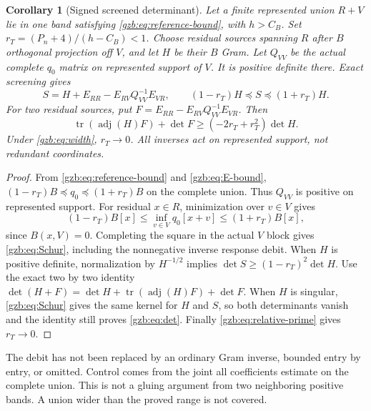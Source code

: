 \documentclass[11pt,a4paper]{article}
\numberwithin{equation}{section}
\newtheorem{corollary}[theorem]{Corollary}
\theoremstyle{definition}\newtheorem{definition}[theorem]{Definition}
\theoremstyle{remark}\newtheorem{remark}[theorem]{Remark}
\DeclareMathOperator{\adj}{adj}
\begin{document}
\begin{corollary}[Signed screened determinant]\label{gzb:cor:schur}
Let a finite represented union $R+V$ lie in one band satisfying
\eqref{gzb:eq:reference-bound}, with $h>C_B$. Set
$r_T=(P_n+4)/(h-C_B)<1$.
Choose residual sources spanning $R$ after $B$ orthogonal projection
off $V$, and let $H$ be their $B$ Gram.
Let $Q_{VV}$ be the actual complete $q_0$ matrix on represented support
of $V$. It is positive definite there. Exact screening gives
\begin{equation}\label{gzb:eq:Schur}
 S=H+E_{RR}-E_{RV}Q_{VV}^{-1}E_{VR},\qquad
 (1-r_T)H\preceq S\preceq(1+r_T)H.
\end{equation}
For two residual sources, put
$F=E_{RR}-E_{RV}Q_{VV}^{-1}E_{VR}$. Then
\begin{equation}\label{gzb:eq:det}
 \operatorname{tr}(\adj(H)F)+\det F
                   \ge(-2r_T+r_T^2)\det H.
\end{equation}
Under \eqref{gzb:eq:width}, $r_T\to0$.
All inverses act on represented support, not redundant coordinates.
\end{corollary}
\begin{proof}
From \eqref{gzb:eq:reference-bound} and \eqref{gzb:eq:E-bound},
$(1-r_T)B\preceq q_0\preceq(1+r_T)B$ on the complete union.
Thus $Q_{VV}$ is positive on represented support.
For residual $x\in R$, minimization over $v\in V$ gives
\[
 (1-r_T)B[x]\le\inf_{v\in V}q_0[x+v]\le(1+r_T)B[x],
\]
since $B(x,V)=0$.
Completing the square in the actual $V$ block gives \eqref{gzb:eq:Schur},
including the nonnegative inverse response debit.
When $H$ is positive definite, normalization by $H^{-1/2}$ implies
$\det S\ge(1-r_T)^2\det H$.
Use the exact two by two identity
$\det(H+F)=\det H+\operatorname{tr}(\adj(H)F)+\det F$.
When $H$ is singular, \eqref{gzb:eq:Schur} gives the same kernel for $H$
and $S$, so both determinants vanish and the identity still proves
\eqref{gzb:eq:det}. Finally \eqref{gzb:eq:relative-prime} gives $r_T\to0$.
\end{proof}

The debit has not been replaced by an ordinary Gram inverse, bounded
entry by entry, or omitted. Control comes from the joint all coefficients
estimate on the complete union. This is not a gluing argument from two
neighboring positive bands. A union wider than the proved range is not
covered.
\end{document}
